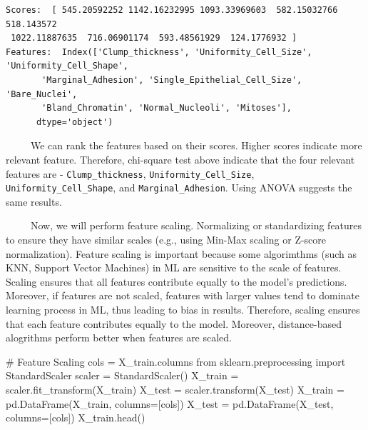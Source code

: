 \documentclass[
  letterpaper,
  DIV=11,
  numbers=noendperiod]{scrreprt}
\newenvironment{Shaded}{\begin{snugshade}}{\end{snugshade}}
\newcommand{\CommentTok}[1]{\textcolor[rgb]{0.37,0.37,0.37}{#1}}
\newcommand{\ImportTok}[1]{\textcolor[rgb]{0.00,0.46,0.62}{#1}}
\newcommand{\NormalTok}[1]{\textcolor[rgb]{0.00,0.23,0.31}{#1}}
\newcommand{\OperatorTok}[1]{\textcolor[rgb]{0.37,0.37,0.37}{#1}}
\begin{document}
\begin{verbatim}
Scores:  [ 545.20592252 1142.16232995 1093.33969603  582.15032766  518.143572
 1022.11887635  716.06901174  593.48561929  124.1776932 ]
Features:  Index(['Clump_thickness', 'Uniformity_Cell_Size', 'Uniformity_Cell_Shape',
       'Marginal_Adhesion', 'Single_Epithelial_Cell_Size', 'Bare_Nuclei',
       'Bland_Chromatin', 'Normal_Nucleoli', 'Mitoses'],
      dtype='object')
\end{verbatim}

~~~~~We can rank the features based on their scores. Higher scores
indicate more relevant feature. Therefore, chi-square test above
indicate that the four relevant features are -
\texttt{Clump\_thickness}, \texttt{Uniformity\_Cell\_Size},
\texttt{Uniformity\_Cell\_Shape}, and \texttt{Marginal\_Adhesion}. Using
ANOVA suggests the same results.

~~~~~Now, we will perform feature scaling. Normalizing or standardizing
features to ensure they have similar scales (e.g., using Min-Max scaling
or Z-score normalization). Feature scaling is important because some
algorimthms (such as KNN, Support Vector Machines) in ML are sensitive
to the scale of features. Scaling ensures that all features contribute
equally to the model's predictions. Moreover, if features are not
scaled, features with larger values tend to dominate learning process in
ML, thus leading to bias in results. Therefore, scaling ensures that
each feature contributes equally to the model. Moreover, distance-based
alogrithms perform better when features are scaled.

\begin{Shaded}
\begin{Highlighting}[]
\CommentTok{\# Feature Scaling }
\NormalTok{cols }\OperatorTok{=}\NormalTok{ X\_train.columns}
\ImportTok{from}\NormalTok{ sklearn.preprocessing }\ImportTok{import}\NormalTok{ StandardScaler}
\NormalTok{scaler }\OperatorTok{=}\NormalTok{ StandardScaler()}
\NormalTok{X\_train }\OperatorTok{=}\NormalTok{ scaler.fit\_transform(X\_train)}
\NormalTok{X\_test }\OperatorTok{=}\NormalTok{ scaler.transform(X\_test)}
\NormalTok{X\_train }\OperatorTok{=}\NormalTok{ pd.DataFrame(X\_train, columns}\OperatorTok{=}\NormalTok{[cols])}
\NormalTok{X\_test }\OperatorTok{=}\NormalTok{ pd.DataFrame(X\_test, columns}\OperatorTok{=}\NormalTok{[cols])}
\NormalTok{X\_train.head()}
\end{Highlighting}
\end{Shaded}
\end{document}
